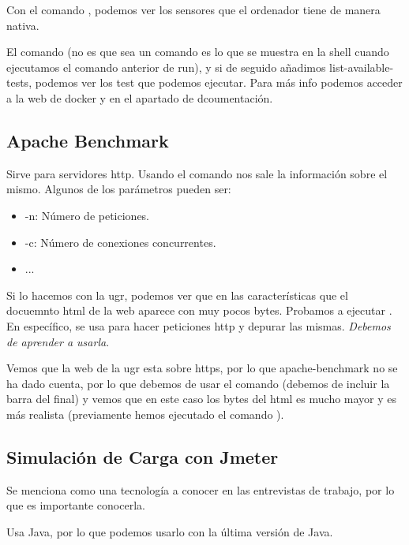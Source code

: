 Con el comando , podemos ver los sensores que el ordenador tiene de manera nativa.

El comando (no es que sea un comando es lo que se muestra en la shell cuando ejecutamos el comando anterior de run), y si de seguido añadimos list-available-tests, podemos ver los test que podemos ejecutar. Para más info podemos acceder a la web de docker y en el apartado de dcoumentación.





\subsection*{Apache Benchmark}

Sirve para servidores http. Usando el comando  nos sale la información sobre el mismo. Algunos de los parámetros pueden ser:
\begin{itemize}
    \item -n: Número de peticiones.
    \item -c: Número de conexiones concurrentes.
    \item ...
\end{itemize}

Si lo hacemos con la ugr, podemos ver que en las características que el docuemnto html de la web aparece con muy pocos bytes. Probamos a ejecutar . En específico,  se usa para hacer peticiones http y depurar las mismas. \textit{Debemos de aprender a usarla}.

Vemos que la web de la ugr esta sobre https, por lo que apache-benchmark no se ha dado cuenta, por lo que debemos de usar el comando  (debemos de incluir la barra del final) y vemos que en este caso los bytes del html es mucho mayor y es más realista (previamente hemos ejecutado el comando ).



\subsection*{Simulación de Carga con Jmeter}

Se menciona como una tecnología a conocer en las entrevistas de trabajo, por lo que es importante conocerla. 

Usa Java, por lo que podemos usarlo con la última versión de Java.

